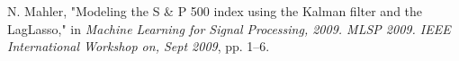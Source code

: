 \documentclass[11pt, fleqn]{article}
\begin{document}
\begin{figure}[!h]
  	\centering
  	
\end{figure}

\begin{thebibliography}{9}
N. Mahler, "Modeling the S \& P 500 index using the Kalman filter and the LagLasso," in \textit{Machine Learning for Signal Processing, 2009. MLSP 2009. IEEE International Workshop on, Sept 2009}, pp. 1–6.

\end{thebibliography}
\end{document}
